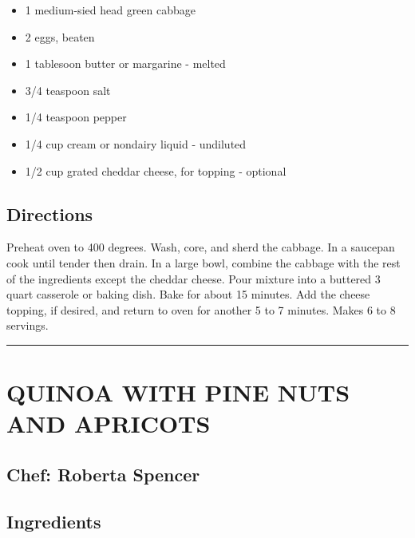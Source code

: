 \documentclass[
]{book}
\providecommand{\tightlist}{%
  \setlength{\itemsep}{0pt}\setlength{\parskip}{0pt}}
\begin{document}
\begin{itemize}
\tightlist
\item
  1 medium-sied head green cabbage
\item
  2 eggs, beaten
\item
  1 tablesoon butter or margarine - melted
\item
  3/4 teaspoon salt
\item
  1/4 teaspoon pepper
\item
  1/4 cup cream or nondairy liquid - undiluted
\item
  1/2 cup grated cheddar cheese, for topping - optional
\end{itemize}

\hypertarget{directions-34}{%
\subsection*{Directions}\label{directions-34}}


Preheat oven to 400 degrees. Wash, core, and sherd the cabbage. In a saucepan
cook until tender then drain.
In a large bowl, combine the cabbage with the rest of the ingredients
except the cheddar cheese. Pour mixture into a buttered 3 quart casserole
or baking dish. Bake for about 15 minutes. Add the cheese topping,
if desired, and return to oven for another 5 to 7 minutes. Makes 6 to 8 servings.

\begin{center}\rule{0.5\linewidth}{0.5pt}\end{center}

\hypertarget{quinoa-with-pine-nuts-and-apricots}{%
\section*{QUINOA WITH PINE NUTS AND APRICOTS}\label{quinoa-with-pine-nuts-and-apricots}}


\hypertarget{chef-roberta-spencer-9}{%
\subsection*{Chef: Roberta Spencer}\label{chef-roberta-spencer-9}}


\hypertarget{ingredients-35}{%
\subsection*{Ingredients}\label{ingredients-35}}
\end{document}
